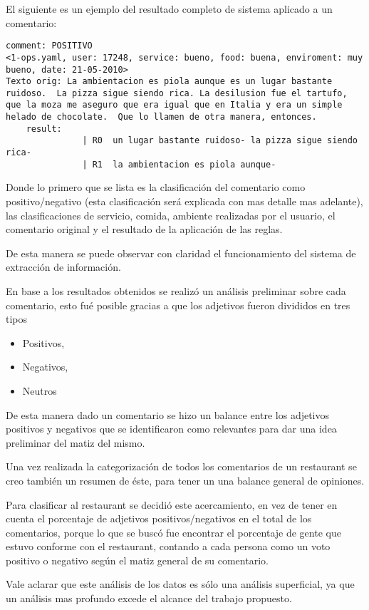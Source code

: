 El siguiente es un ejemplo del resultado completo de sistema aplicado a un comentario:
\begin{verbatim}
comment: POSITIVO
<1-ops.yaml, user: 17248, service: bueno, food: buena, enviroment: muy bueno, date: 21-05-2010>
Texto orig: La ambientacion es piola aunque es un lugar bastante ruidoso.  La pizza sigue siendo rica. La desilusion fue el tartufo, que la moza me aseguro que era igual que en Italia y era un simple helado de chocolate.  Que lo llamen de otra manera, entonces. 
	result:
               | R0  un lugar bastante ruidoso- la pizza sigue siendo rica-
               | R1  la ambientacion es piola aunque-
\end{verbatim}
               
Donde lo primero que se lista es la clasificación del comentario como positivo/negativo (esta clasificación será explicada con mas detalle mas adelante), las clasificaciones de servicio, comida, ambiente realizadas por el usuario, el comentario original y el resultado de la aplicación de las reglas.

De esta manera se puede observar con claridad el funcionamiento del sistema de extracción de información.

En base a los resultados obtenidos se realizó un análisis preliminar sobre cada comentario, esto fué posible gracias a que los adjetivos fueron divididos en tres tipos
\begin{itemize}
\item Positivos,
\item Negativos,
\item Neutros
\end{itemize}

De esta manera dado un comentario se hizo un balance entre los adjetivos positivos y negativos que se identificaron como relevantes para dar una idea preliminar del matiz del mismo.

Una vez realizada la categorización de todos los comentarios de un restaurant se creo también un resumen de éste, para tener un una balance general de opiniones.

Para clasificar al restaurant se decidió este acercamiento, en vez de tener en cuenta el porcentaje de adjetivos positivos/negativos en el total de los comentarios, porque lo que se buscó fue encontrar el porcentaje de gente que estuvo conforme con el restaurant, contando a cada persona como un voto positivo o negativo según el matiz general de su comentario.

Vale aclarar que este análisis de los datos es sólo una análisis superficial, ya que un análisis mas profundo excede el alcance del trabajo propuesto.

